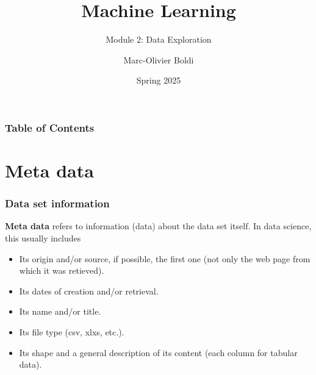 
\title{Machine Learning}
\subtitle{Module 2: Data Exploration}
\author[MOB]{Marc-Olivier Boldi}
\date{Spring 2025}

\begin{frame}
	\titlepage
\end{frame}
\begin{frame}
\frametitle{Table of Contents}
	\tableofcontents
\end{frame}
\section{Meta data}
\begin{frame}
\frametitle{Data set information}
{\bf Meta data} refers to information (data) about the data set itself. In data science, this usually includes
\begin{itemize}
\item Its origin and/or source, if possible, the first one (not only the web page from which it was retieved).
\item Its dates of creation and/or retrieval.
\item Its name and/or title.
\item Its file type (csv, xlxs, etc.).
\item Its shape and a general description of its content (each column for tabular data).
\end{itemize}
\end{frame}
